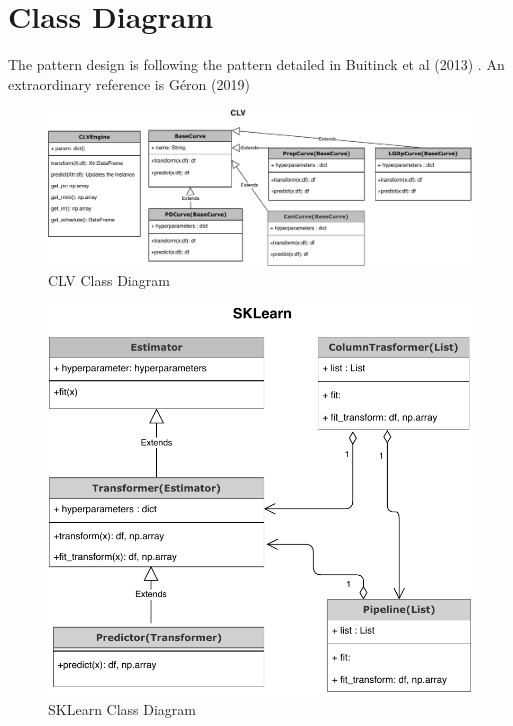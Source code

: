 \section{Class Diagram}
The pattern design is following the pattern detailed in Buitinck et al (2013)  \cite{scikitlearn-2013}. An extraordinary reference is G\'eron (2019) \cite{geron2019}
\begin{figure}[H]
  \centering
      \includegraphics[width=1\textwidth]{diagrCLV.pdf} 
 \caption{CLV Class Diagram}
 \label{fig:TestCD}
\end{figure}

\begin{figure}[H]
  \centering
      \includegraphics[width=.6\textwidth]{diagrSklearn.pdf} 
 \caption{SKLearn Class Diagram}
 \label{fig:TestSCD}
\end{figure}

